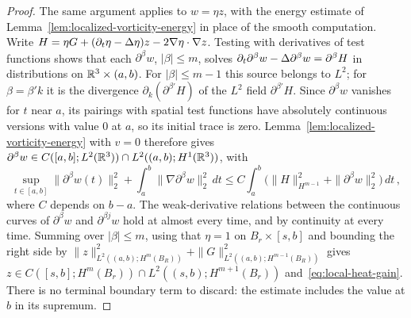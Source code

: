 \documentclass[11pt,letterpaper]{article}
\numberwithin{equation}{section}
\theoremstyle{plain}
\theoremstyle{definition}
\theoremstyle{remark}
\begin{document}
\begin{proof}
The same argument applies to $w=\eta z$, with the energy estimate of Lemma~\ref{lem:localized-vorticity-energy} in place of the smooth computation. Write $H=\eta G+(\partial_t\eta-\Delta\eta)z-2\nabla\eta\cdot\nabla z$. Testing with derivatives of test functions shows that each $\partial^\beta w$, $|\beta|\le m$, solves $\partial_t\partial^\beta w-\Delta\partial^\beta w=\partial^\beta H$ in distributions on $\mathbb{R}^3\times(a,b)$. For $|\beta|\le m-1$ this source belongs to $L^2$; for $\beta=\beta'k$ it is the divergence $\partial_k(\partial^{\beta'}H)$ of the $L^2$ field $\partial^{\beta'}H$. Since $\partial^\beta w$ vanishes for $t$ near $a$, its pairings with spatial test functions have absolutely continuous versions with value $0$ at $a$, so its initial trace is zero. Lemma~\ref{lem:localized-vorticity-energy} with $v=0$ therefore gives $\partial^\beta w\in C([a,b];L^2(\mathbb{R}^3))\cap L^2((a,b);H^1(\mathbb{R}^3))$, with
\[
 \sup_{t\in[a,b]}\|\partial^\beta w(t)\|_2^2+\int_a^b\|\nabla\partial^\beta w\|_2^2\,dt
 \le C\int_a^b\bigl(\|H\|_{H^{m-1}}^2+\|\partial^\beta w\|_2^2\bigr)\,dt\,,
\]
where $C$ depends on $b-a$. The weak-derivative relations between the continuous curves of $\partial^\beta w$ and $\partial^{\beta j}w$ hold at almost every time, and by continuity at every time. Summing over $|\beta|\le m$, using that $\eta=1$ on $B_r\times[s,b]$ and bounding the right side by $\|z\|_{L^2((a,b);H^m(B_R))}^2+\|G\|_{L^2((a,b);H^{m-1}(B_R))}^2$ gives $z\in C([s,b];H^m(B_r))\cap L^2((s,b);H^{m+1}(B_r))$ and~\eqref{eq:local-heat-gain}. There is no terminal boundary term to discard: the estimate includes the value at $b$ in its supremum.


\end{proof}
\end{document}
